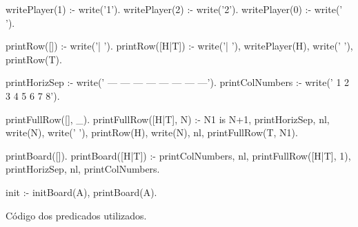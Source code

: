 \documentclass[15pt,a4paper]{article}
\begin{document}
\begin{code}[H]
	\begin{verbatimtab} %
writePlayer(1) :-
	write('1').
writePlayer(2) :-
	write('2').
writePlayer(0) :-
	write(' ').

printRow([])    :-
	write('| ').
printRow([H|T]) :-
	write('| '),
	writePlayer(H),
	write(' '),
	printRow(T).

printHorizSep   :-
	write('   --- --- --- --- --- --- --- ---').
printColNumbers :-
	write('    1   2   3   4   5   6   7   8').

printFullRow([], _).
printFullRow([H|T], N) :-
	N1 is N+1,
	printHorizSep,
	nl,
	write(N),
	write(' '),
	printRow(H),
	write(N),
	nl,
	printFullRow(T, N1).

printBoard([]).
printBoard([H|T]) :-
	printColNumbers,
	nl,
	printFullRow([H|T], 1),
	printHorizSep,
	nl,
	printColNumbers.

init :-
	initBoard(A),
	printBoard(A).
\end{verbatimtab}
\caption{Código dos predicados utilizados.}
\end{code}
\end{document}
